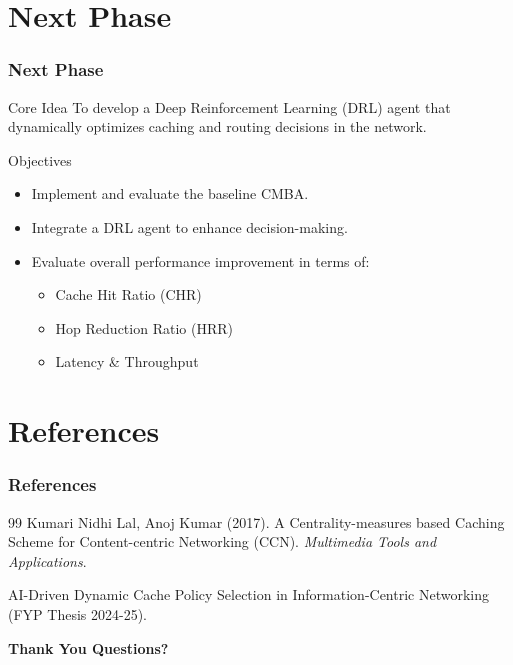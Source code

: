 \documentclass{beamer}
\begin{document}
\section{Next Phase}
\begin{frame}
  \frametitle{Next Phase}
  \begin{block}{Core Idea}
    To develop a Deep Reinforcement Learning (DRL) agent that dynamically optimizes caching and routing decisions in the network.
  \end{block}
  \begin{block}{Objectives}
    \begin{itemize}
        \item Implement and evaluate the baseline CMBA.
        \item Integrate a DRL agent to enhance decision-making.
        \item Evaluate overall performance improvement in terms of:
        \begin{itemize}
            \item Cache Hit Ratio (CHR)
            \item Hop Reduction Ratio (HRR)
            \item Latency \& Throughput
        \end{itemize}
    \end{itemize}
  \end{block}
\end{frame}

\section{References}
\begin{frame}
  \frametitle{References}
  \begin{thebibliography}{99}
    Kumari Nidhi Lal, Anoj Kumar (2017).
    \newblock A Centrality-measures based Caching Scheme for Content-centric Networking (CCN).
    \newblock \textit{Multimedia Tools and Applications}.
    
    AI-Driven Dynamic Cache Policy Selection in Information-Centric Networking (FYP Thesis 2024-25).

  \end{thebibliography}
\end{frame}

\begin{frame}
  \centering
  \vspace*{2cm}
  \Huge\bfseries Thank You
  \vfill
  \Large Questions?
\end{frame}
\end{document}
